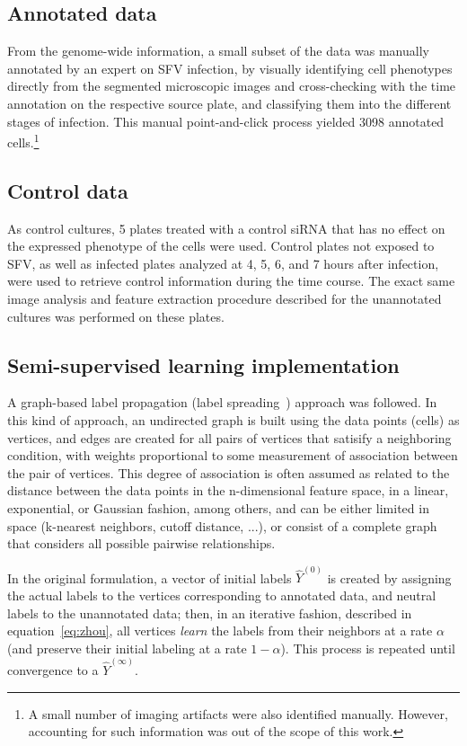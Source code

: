 \documentclass[oneside, a4paper, draft]{memoir} %
\begin{document}
\subsection{Annotated data}
From the genome-wide information, a small subset of the data was manually annotated by an expert on SFV infection, by
visually identifying cell phenotypes directly from the segmented microscopic images and cross-checking with the time
annotation on the respective source plate, and classifying them into the different stages of infection. This manual
 point-and-click process yielded 3098 annotated cells.\footnote{A small number of
imaging artifacts were also identified manually. However, accounting for such information was out of the scope of
this work.}

\subsection{Control data}
As control cultures, 5 plates treated with a control siRNA that has no effect on the expressed phenotype of the cells
were used. Control plates not exposed to SFV, as well as infected plates analyzed at 4, 5, 6, and 7 hours after
infection, were used to retrieve control information during the time course. The exact same image analysis and
feature extraction procedure described for the unannotated cultures was performed on these plates. 

\subsection{Semi-supervised learning implementation}
A graph-based label propagation (label spreading~\cite{zhou2004learning}) approach was followed. In this kind of
approach, an undirected graph is built using the data points (cells) as vertices, and edges are created for all pairs
of vertices that satisify a neighboring condition, with weights proportional to some measurement of association
between the pair of vertices. This degree of association is often assumed as related to the distance
between the data points in the n-dimensional feature space, in a linear, exponential, or Gaussian fashion, among
others, and can be either limited in space (k-nearest neighbors, cutoff distance, ...), or consist of a
complete graph that considers all possible pairwise relationships.

In the original formulation, a vector of initial labels $\hat{Y}^{(0)}$ is created by assigning the actual labels 
to the vertices corresponding to annotated data, and neutral labels to the unannotated data; then, in an iterative
fashion, described in equation~\ref{eq:zhou}, all vertices \emph{learn} the labels from their neighbors at a
rate $\alpha$ (and preserve their initial labeling at a rate $1-\alpha$). This process is repeated until convergence
to a $\hat{Y}^{(\infty)}$.
\end{document}
